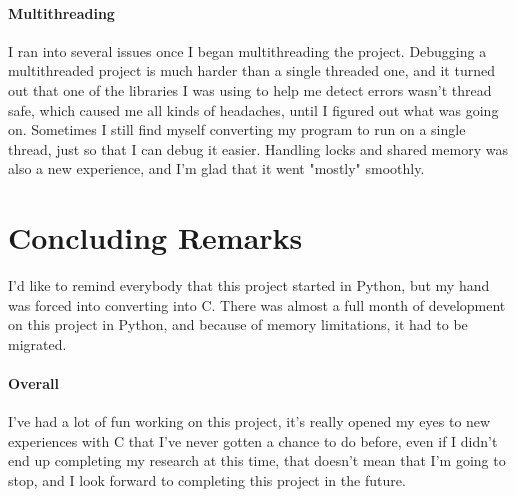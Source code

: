 \documentclass{article}
\begin{document}
\paragraph{Multithreading} I ran into several issues once I began multithreading the project. Debugging a multithreaded project is much harder than a single threaded one, and it turned out that one of the libraries I was using to help me detect errors wasn't thread safe, which caused me all kinds of headaches, until I figured out what was going on. Sometimes I still find myself converting my program to run on a single thread, just so that I can debug it easier. Handling locks and shared memory was also a new experience, and I'm glad that it went "mostly" smoothly.

\section{Concluding Remarks}

I'd like to remind everybody that this project started in Python, but my hand was forced into converting into C. There was almost a full month of development on this project in Python, and because of memory limitations, it had to be migrated.

\paragraph{Overall} I've had a lot of fun working on this project, it's really opened my eyes to new experiences with C that I've never gotten a chance to do before, even if I didn't end up completing my research at this time, that doesn't mean that I'm going to stop, and I look forward to completing this project in the future.
\end{document}

